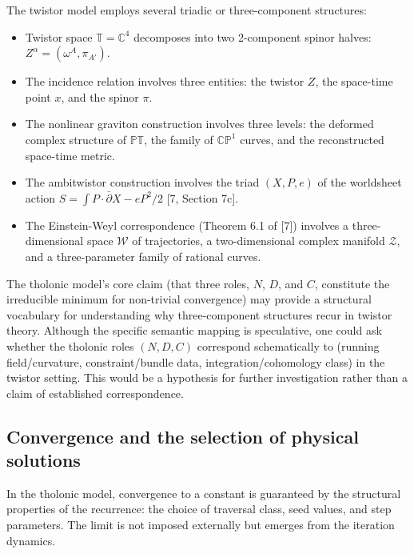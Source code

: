 \documentclass[12pt]{article}
\providecommand{\tightlist}{%
  \setlength{\itemsep}{0pt}\setlength{\parskip}{0pt}}
\begin{document}
The twistor model employs several triadic or three-component structures:

\begin{itemize}
\tightlist
\item
  Twistor space \(\mathbb{T} = \mathbb{C}^4\) decomposes into two
  2-component spinor halves: \(Z^\alpha = (\omega^A, \pi_{A'})\).
\item
  The incidence relation involves three entities: the twistor \(Z\), the
  space-time point \(x\), and the spinor \(\pi\).
\item
  The nonlinear graviton construction involves three levels: the
  deformed complex structure of \(\mathbb{PT}\), the family of
  \(\mathbb{CP}^1\) curves, and the reconstructed space-time metric.
\item
  The ambitwistor construction involves the triad \((X, P, e)\) of the
  worldsheet action \(S = \int P \cdot \bar{\partial} X - e P^2/2\)
  {[}7, Section 7c{]}.
\item
  The Einstein-Weyl correspondence (Theorem 6.1 of {[}7{]}) involves a
  three-dimensional space \(\mathcal{W}\) of trajectories, a
  two-dimensional complex manifold \(\mathcal{Z}\), and a
  three-parameter family of rational curves.
\end{itemize}

The tholonic model's core claim (that three roles, \(N\), \(D\), and
\(C\), constitute the irreducible minimum for non-trivial convergence)
may provide a structural vocabulary for understanding why
three-component structures recur in twistor theory. Although the
specific semantic mapping is speculative, one could ask whether the
tholonic roles \((N, D, C)\) correspond schematically to (running
field/curvature, constraint/bundle data, integration/cohomology class)
in the twistor setting. This would be a hypothesis for further
investigation rather than a claim of established correspondence.

\subsection{Convergence and the selection of physical solutions}\label{convergence-and-the-selection-of-physical-solutions}

In the tholonic model, convergence to a constant is guaranteed by the
structural properties of the recurrence: the choice of traversal class,
seed values, and step parameters. The limit is not imposed externally
but emerges from the iteration dynamics.
\end{document}

